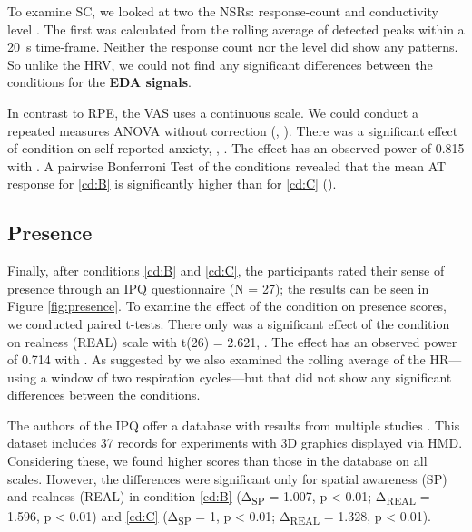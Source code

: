 To examine \gls{SC}, we looked at two the \glspl{NSR}: response-count and conductivity level \autocite{SkinConductivityExplained}. The first was calculated from the rolling average of detected peaks within a \SI{20}{\second} time-frame. Neither the response count nor the level did show any patterns. So unlike the \gls{HRV}, we could not find any significant differences between the conditions for the \textbf{\gls{EDA} signals}.



In contrast to \gls{RPE}, the \gls{VAS}  uses a continuous scale. We could conduct a repeated measures \gls{ANOVA} without correction (, ). There was a significant effect of condition on self-reported anxiety, , . The effect has an observed power of 0.815 with . A pairwise Bonferroni Test of the conditions revealed that the mean \gls{AT} response for \ref{cd:B} is significantly higher than for \ref{cd:C} ().

\subsection{Presence}

Finally, after conditions \ref{cd:B} and \ref{cd:C}, the participants rated their sense of presence through an \gls{IPQ} questionnaire (N = 27); the results can be seen in Figure \ref{fig:presence}. To examine the effect of the condition on presence scores, we conducted paired t-tests. There only was a significant effect of the condition on realness (REAL) scale with t(26) = 2.621, . The effect has an observed power of 0.714 with . As suggested by \textcite{Meehan2001} we also examined the rolling average of the \gls{HR}---using a window of two respiration cycles---but that did not show any significant differences between the conditions.



The authors of the \gls{IPQ} offer a database with results from multiple studies \autocite{IPQDatabase2016}. This dataset includes 37 records for experiments with 3D graphics displayed via \gls{HMD}. Considering these, we found higher scores than those in the database on all scales. However, the differences were significant only for spatial awareness (SP) and realness (REAL)  in condition \ref{cd:B} (Δ\textsubscript{SP} = 1.007, p < 0.01; Δ\textsubscript{REAL} = 1.596, p < 0.01) and \ref{cd:C} (Δ\textsubscript{SP} = 1, p < 0.01; Δ\textsubscript{REAL} = 1.328, p < 0.01).

